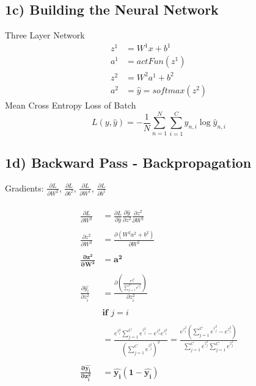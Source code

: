 \documentclass{article}
\begin{document}
\subsection*{1c) Building the Neural Network}
Three Layer Network
\begin{align}
	z^{1} &= W^{1}x + b^{1}\\
	a^{1} &=actFun(z^{1})\\
	z^{2} &=W^{2}a^{1}+b^{2}\\
	a^{2} &=\hat{y}=softmax(z^{2})
\end{align}
Mean Cross Entropy Loss of Batch
\begin{equation}
	L(y,\hat{y}) = -\frac{1}{N}\sum_{n=1}^{N}\sum_{i=1}^{C}y_{n,i}\log{\hat{y}_{n,i}}
\end{equation}

\subsection*{1d) Backward Pass - Backpropagation}
Gradients: $\frac{\partial L}{\partial W^{2}}$, $\frac{\partial L}{\partial b^{2}}$, $\frac{\partial L}{\partial W^{1}}$, $\frac{\partial L}{\partial b^{1}}$\\ \\
	\begin{align*}
		\frac{\partial L}{\partial W^{2}} &= \frac{\partial L}{\partial \hat{y}}\frac{\partial \hat{y}}{\partial z^{2}}\frac{\partial z^{2}}{\partial W^{2}}\\ \\
		\frac{\partial z^{2}}{\partial W^{2}} &= \frac{\partial (W^{2}a^{2}+b^{2})}{\partial W^{2}}\\ \\
		\boldsymbol{\frac{\partial z^{2}}{\partial W^{2}}}& \boldsymbol{=a^{2}}
	\\
	\\
		\frac{\partial \hat{y_i}}{\partial z_i^{2}} &= \frac{\partial \left(\frac{e^{z_i^2}}{\sum_{j=1}^Ce^{z_j^2}}\right)}{\partial z_i^2}\\ \\
		&  \textbf{if }   j = i\\ \\		
		& = \frac{e^{z_i^2}\sum_{j=1}^Ce^{z_j^2}-e^{z_i^2}e^{z_i^2}}{\left(\sum_{j=1}^Ce^{z_j^2}\right)^2} = \frac{e^{z_i^2}(\sum_{j=1}^Ce^{z_j^2}-e^{z_i^2})}{\sum_{j=1}^Ce^{z_j^2}\sum_{j=1}^Ce^{z_j^2}}\\ \\
		\boldsymbol{\frac{\partial \hat{y_i}}{\partial z_i^{2}}} & \boldsymbol{=\hat{y_i}(1-\hat{y_i})}
	\end{align*}
\end{document}
